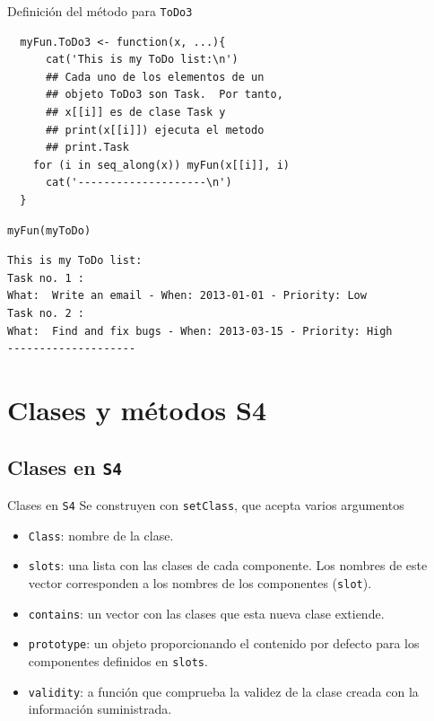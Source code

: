 \documentclass[xcolor={usenames,svgnames,dvipsnames}]{beamer}
\begin{document}
\begin{frame}[label={sec:org02aca0f},fragile]{Definición del método para \texttt{ToDo3}}
 \lstset{language=r,label= ,caption= ,captionpos=b,numbers=none}
\begin{lstlisting}
  myFun.ToDo3 <- function(x, ...){
      cat('This is my ToDo list:\n')
      ## Cada uno de los elementos de un
      ## objeto ToDo3 son Task.  Por tanto,
      ## x[[i]] es de clase Task y
      ## print(x[[i]]) ejecuta el metodo
      ## print.Task
    for (i in seq_along(x)) myFun(x[[i]], i)
      cat('--------------------\n')
  }
\end{lstlisting}

\lstset{language=r,label= ,caption= ,captionpos=b,numbers=none}
\begin{lstlisting}
myFun(myToDo)
\end{lstlisting}

\begin{verbatim}
This is my ToDo list:
Task no. 1 :
What:  Write an email - When: 2013-01-01 - Priority: Low 
Task no. 2 :
What:  Find and fix bugs - When: 2013-03-15 - Priority: High 
--------------------
\end{verbatim}
\end{frame}


\section{Clases y métodos S4}
\label{sec:orgf874475}

\subsection{Clases en \texttt{S4}}
\label{sec:org27f950b}
\begin{frame}[label={sec:org963e4f5},fragile]{Clases en \texttt{S4}}
 Se construyen con \texttt{setClass}, que acepta varios argumentos
\begin{itemize}
\item \texttt{Class}: nombre de la clase.
\item \texttt{slots}: una lista con las clases de cada componente. Los nombres de este vector corresponden a los nombres de los componentes (\texttt{slot}).
\item \texttt{contains}: un vector con las clases que esta nueva clase extiende.
\item \texttt{prototype}: un objeto proporcionando el contenido por defecto para los componentes definidos en \texttt{slots}.
\item \texttt{validity}: a función que comprueba la validez de la clase creada con la información suministrada.
\end{itemize}
\end{frame}
\end{document}
